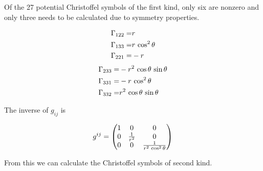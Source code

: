 Of the 27 potential Christoffel symbols of the first kind, only six are 
nonzero and only three needs to be calculated due to symmetry properties.

\begin{twocol}{
\begin{eqnarray*}
\Gamma_{122}=&r \\
\Gamma_{133}=&r\,\cos ^2\theta \\
\Gamma_{221}=&-r \\
\end{eqnarray*}}{
\begin{eqnarray*}
\Gamma_{233}=&-r^2\,\cos \theta\,\sin \theta \\
\Gamma_{331}=&-r\,\cos ^2\theta \\
\Gamma_{332}=&r^2\,\cos \theta\,\sin \theta
\end{eqnarray*}}
\end{twocol}

The inverse of $g_{ij}$ is

$$ 
    g^{ij}=\begin{pmatrix}1&0&0\cr 0&\frac{1}{r^2}&0\cr 0&0&\frac{1}{r^2\,\cos ^2
 \theta}\cr \end{pmatrix}
$$


From this we can calculate the Christoffel symbols of second kind. 

